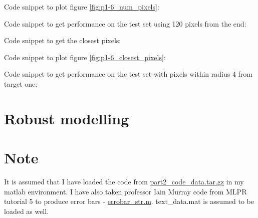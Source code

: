 \documentclass{article}
\begin{document}
			Code snippet to plot figure \ref{fig:p1-6_num_pixels}:
			
			Code snippet to get performance on the test set using 120 pixels from the end:
			
			Code snippet to get the closest pixels:
			
			Code snippet to plot figure \ref{fig:p1-6_closest_pixels}:
			
			Code snippet to get performance on the test set with pixels within radius 4 from target one:
			
			\newpage
			
		\section{Robust modelling}
			\section*{Note}
				It is assumed that I have loaded the code from \href{http://www.inf.ed.ac.uk/teaching/courses/mlpr/2015/assignment/part2_code_data.tar.gz}{part2\_code\_data.tar.gz} in my matlab environment. I have also taken professor Iain Murray code from MLPR tutorial 5 to produce error bars - \href{http://homepages.inf.ed.ac.uk/imurray2/code/imurray-matlab/errorbar_str.m}{errobar\_str.m}. text\_data.mat is assumed to be loaded as well.
\end{document}
